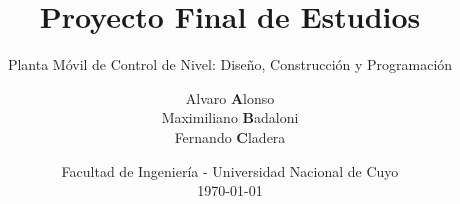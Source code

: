 
\title[{\makebox[.5\paperwidth]{PFE: Planta Móvil de Control de Nivel\hfill%
       \insertframenumber/\inserttotalframenumber}}]{Proyecto Final de Estudios}

\subtitle{Planta Móvil de Control de Nivel: Diseño, Construcción y Programación}
\author{\texorpdfstring{Alvaro \textbf{A}lonso\\
			Maximiliano \textbf{B}adaloni\\
			Fernando \textbf{C}ladera}
			{Alonso Badaloni Cladera}
	}


\date{
  \scriptsize Facultad de Ingeniería - Universidad Nacional de Cuyo
  \\
  \vspace{.10cm}
  \today
}
